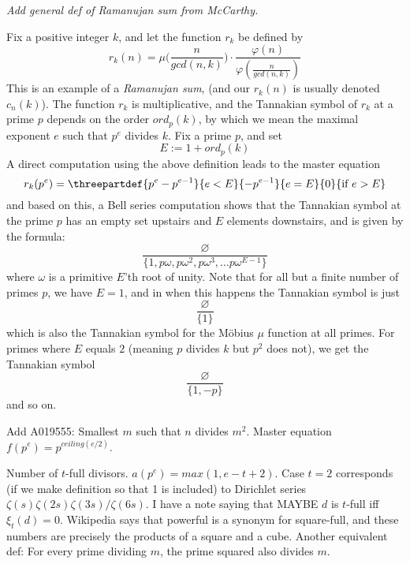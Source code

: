 \documentclass[a4paper]{article}
\begin{document}
\begin{example}

\emph{Add general def of Ramanujan sum from McCarthy.}


Fix a positive integer $k$, and let the function $r_k$ be defined by
$$r_k(n) = \mu \big(   \frac{n}{gcd(n, k)}    \big) \cdot \frac{ \varphi(n)   }{  \varphi(\frac{n}{gcd(n, k)})  }  $$  
This is an example of a \emph{Ramanujan sum}, (and our $r_k(n)$ is usually denoted $c_n(k)$). The function $r_k$ is multiplicative, and the Tannakian symbol of $r_k$ at a prime $p$ depends on the order $ord_p(k)$, by which we mean the maximal exponent $e$ such that $p^e$ divides $k$. Fix a prime $p$, and set
$$  E:= 1+ ord_p(k) $$
A direct computation using the above definition leads to the master equation
$$  r_k(p^e) =  \threepartdef { p^e-p^{e-1} } { e < E } {-p^{e-1}} { e = E  } {0}  { \textrm{if } e > E} $$
and based on this, a Bell series computation shows that the Tannakian symbol at the prime $p$ has an empty set upstairs and $E$ elements downstairs, and is given by the formula:
$$  \frac{  \varnothing }{  \{ 1, p \omega, p \omega^2, p \omega^3, \ldots p \omega^{E-1}  \} }   $$
where $\omega$ is a primitive $E$'th root of unity. Note that for all but a finite number of primes $p$, we have $E=1$, and in when this happens the Tannakian symbol is just
$$   \frac{  \varnothing }{ \{ 1\} }    $$
which is also the Tannakian symbol for the M{\"o}bius $\mu$ function at all primes. For primes where $E$ equals $2$ (meaning $p$ divides $k$ but $p^2$ does not), we get the Tannakian symbol
$$   \frac{  \varnothing }{  \{ 1, -p \} }    $$
and so on.
\end{example}


\begin{example}
Add A019555: Smallest $m$ such that $n$ divides $m^2$. Master equation $f(p^e) = p^{ceiling(e/2)}$.

\end{example}

\begin{example}
Number of $t$-full divisors. $a(p^e) = max(1, e-t+2)$. Case $t=2$ corresponds (if we make definition so that 1 is included) to Dirichlet series $\zeta(s) \zeta(2s) \zeta(3s) / \zeta(6s)$. I have a note saying that MAYBE $d$ is $t$-full iff $\xi_t(d) = 0$. Wikipedia says that powerful is a synonym for square-full, and these numbers are precisely the products of a square and a cube. Another equivalent def: For every prime dividing $m$, the prime squared also divides $m$. 
\end{example}
\end{document}
